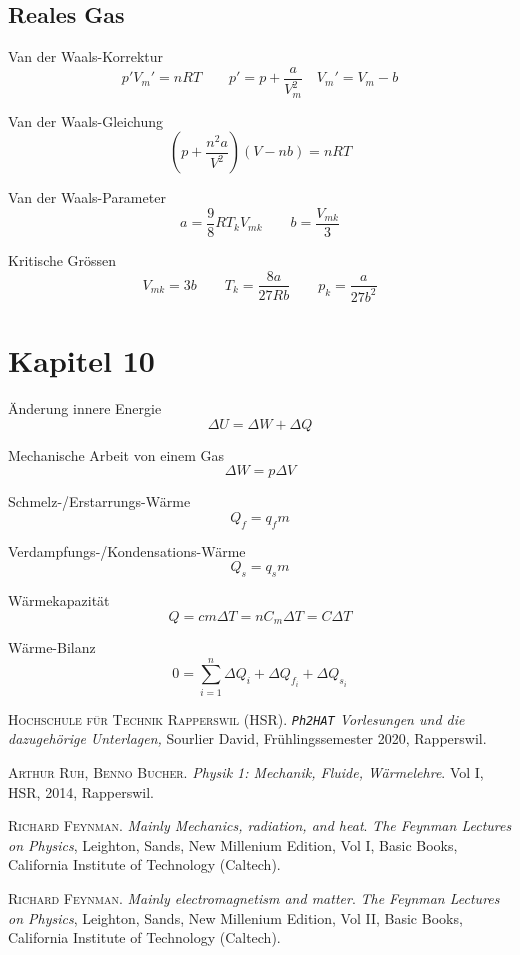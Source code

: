 \documentclass[a4paper, twocolumn]{article}
\numberwithin{equation}{section}
\theoremstyle{hsr-def}
\theoremstyle{hsr-sub}
\theoremstyle{hsr-unnum}
\begin{document}
\subsection*{Reales Gas}
Van der Waals-Korrektur
\[
    p'V_m' = nRT
    \qquad
    p' = p + \frac{a}{V_m^2}
    \quad
    V_m' = V_m - b
\]

Van der Waals-Gleichung
\[
    \left(p + \frac{n^2 a}{V^2} \right)(V - nb) = nRT
\]

Van der Waals-Parameter
\[
    a = \frac{9}{8} R T_k V_{mk}
    \qquad
    b = \frac{V_{mk}}{3}
\]

Kritische Gr\"ossen
\[
    V_{mk} = 3b
    \qquad
    T_k = \frac{8a}{27Rb}
    \qquad
    p_k = \frac{a}{27b^2}
\]

\section*{Kapitel 10}
\"Anderung innere Energie
\[
    \Delta U = \Delta W + \Delta Q
\]

Mechanische Arbeit von einem Gas
\[
    \Delta W = p \Delta V
\]

Schmelz-/Erstarrungs-W\"arme
\[
    Q_f = q_f m
\]

Verdampfungs-/Kondensations-W\"arme
\[
    Q_s = q_s m
\]

W\"armekapazit\"at
\[
    Q = cm\Delta T = n C_m \Delta T = C \Delta T
\]

W\"arme-Bilanz
\[
    0 = \sum_{i = 1}^n \Delta Q_i + \Delta Q_{f_i} + \Delta Q_{s_i}
\]

\begin{thebibliography}{2}
	\textsc{Hochschule f\"ur Technik Rapperswil (HSR)}.
    \textit{\texttt{Ph2HAT} Vorlesungen und die dazugeh\"orige Unterlagen,}
	Sourlier David,
	Fr\"uhlingssemester 2020,
	Rapperswil.

	\textsc{Arthur Ruh, Benno Bucher}.
	\textit{Physik 1: Mechanik, Fluide, W\"armelehre}.
	Vol I, HSR, 2014, Rapperswil.

	\textsc{Richard Feynman}.
	\textit{Mainly Mechanics, radiation, and heat}.
	\textit{The Feynman Lectures on Physics},
	Leighton, Sands,
	New Millenium Edition,
	Vol I,
	Basic Books,
	California Institute of Technology (Caltech).

	\textsc{Richard Feynman}.
	\textit{Mainly electromagnetism and matter}.
	\textit{The Feynman Lectures on Physics},
	Leighton, Sands,
	New Millenium Edition,
	Vol II,
	Basic Books,
	California Institute of Technology (Caltech).
	
\end{thebibliography}
\end{document}
